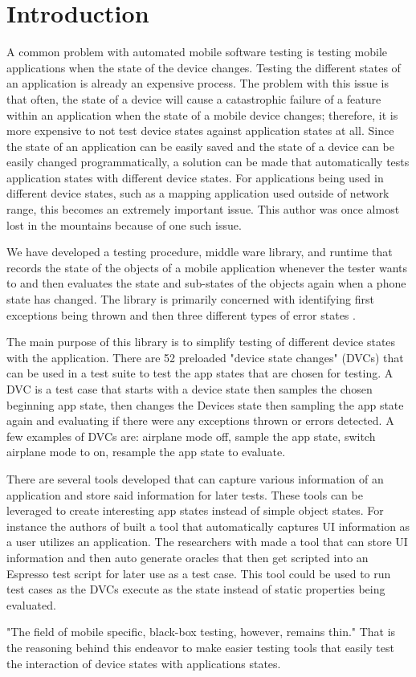 \section{Introduction}
A common problem with automated mobile software testing is testing mobile applications when the state of the device changes.  Testing the different states of an application is already an expensive process. The problem with this issue is that often, the state of a device will cause a catastrophic failure of a feature within an application when the state of a mobile device changes; therefore, it is more expensive to not test device states against application states at all.  Since the state of an application can be easily saved and the state of a device can be easily changed programmatically, a solution can be made that automatically tests application states with different device states.  For applications being used in different device states, such as a mapping application used outside of network range, this becomes an extremely important issue.  This author was once almost lost in the mountains because of one such issue.    

We have developed a testing procedure, middle ware library, and runtime that records the state of the objects of a mobile application whenever the tester wants to and then evaluates the state and sub-states \cite{366932} of the objects again when a phone state has changed.  The library is primarily concerned with identifying first exceptions being thrown and then three different types of error states \cite{366932}.

The main purpose of this library is to simplify testing of different device states with the application.  There are 52 preloaded "device state changes" (DVCs) that can be used in a test suite to test the app states that are chosen for testing.  A DVC is a test case that starts with a device state then samples the chosen beginning app state, then changes the Devices state then sampling the app state again and evaluating if there were any exceptions thrown or errors detected.  A few examples of DVCs are: airplane mode off, sample the app state, switch airplane mode to on, resample the app state to evaluate.

There are several tools developed that can capture various information of an application and store said information for later tests.  These tools can be leveraged to create interesting app states instead of simple object states.  For instance the authors of \cite{7962332} built a tool that automatically captures UI information as a user utilizes an application.  The researchers with\cite{7927971} made a tool that can store UI information and then auto generate oracles that then get scripted into an Espresso test script for later use as a test case.  This tool could be used to run test cases as the DVCs execute as the state instead of static properties being evaluated.  

"The field of mobile specific, black-box testing, however, remains thin." \cite{paulovsky2017high}  That is the reasoning behind this endeavor to make easier testing tools that easily test the interaction of device states with applications states.  

  
  
  
  
 




